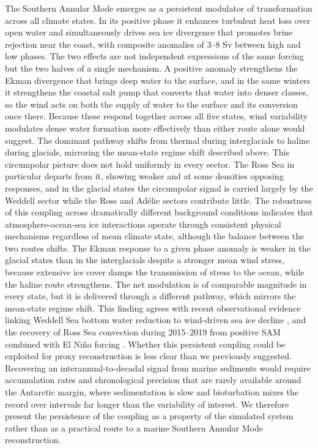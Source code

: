 \documentclass[pdflatex,sn-nature]{sn-jnl}
\begin{document}
The Southern Annular Mode emerges as a persistent modulator of transformation across all climate states. In its positive phase it enhances turbulent heat loss over open water and simultaneously drives sea ice divergence that promotes brine rejection near the coast, with composite anomalies of 3--8 Sv between high and low phases. The two effects are not independent expressions of the same forcing but the two halves of a single mechanism. A positive anomaly strengthens the Ekman divergence that brings deep water to the surface, and in the same winters it strengthens the coastal salt pump that converts that water into denser classes, so the wind acts on both the supply of water to the surface and its conversion once there. Because these respond together across all five states, wind variability modulates dense water formation more effectively than either route alone would suggest. The dominant pathway shifts from thermal during interglacials to haline during glacials, mirroring the mean-state regime shift described above. This circumpolar picture does not hold uniformly in every sector. The Ross Sea in particular departs from it, showing weaker and at some densities opposing responses, and in the glacial states the circumpolar signal is carried largely by the Weddell sector while the Ross and Ad\'elie sectors contribute little. The robustness of this coupling across dramatically different background conditions indicates that atmosphere-ocean-sea ice interactions operate through consistent physical mechanisms regardless of mean climate state, although the balance between the two routes shifts. The Ekman response to a given phase anomaly is weaker in the glacial states than in the interglacials despite a stronger mean wind stress, because extensive ice cover damps the transmission of stress to the ocean, while the haline route strengthens. The net modulation is of comparable magnitude in every state, but it is delivered through a different pathway, which mirrors the mean-state regime shift. This finding agrees with recent observational evidence linking Weddell Sea bottom water reduction to wind-driven sea ice decline \cite{Zhou2023}, and the recovery of Ross Sea convection during 2015--2019 from positive SAM combined with El Ni\~no forcing \cite{Silvano2020}. Whether this persistent coupling could be exploited for proxy reconstruction is less clear than we previously suggested. Recovering an interannual-to-decadal signal from marine sediments would require accumulation rates and chronological precision that are rarely available around the Antarctic margin, where sedimentation is slow and bioturbation mixes the record over intervals far longer than the variability of interest. We therefore present the persistence of the coupling as a property of the simulated system rather than as a practical route to a marine Southern Annular Mode reconstruction.
\end{document}

